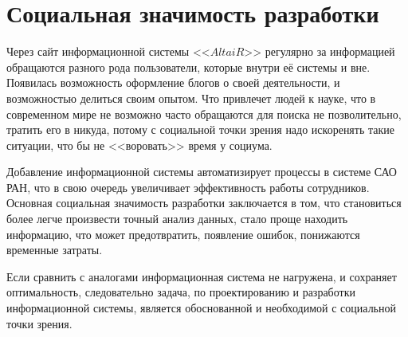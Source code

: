 \section{Социальная значимость разработки}
Через сайт информационной системы <<$AltaiR$>> регулярно за информацией обращаются разного рода пользователи, которые внутри её системы и вне. Появилась возможность оформление блогов о своей деятельности, и возможностью делиться своим опытом. Что привлечет людей к науке, что в современном мире не возможно  часто обращаются для поиска не позволительно, тратить его в никуда, потому с социальной точки зрения надо искоренять такие ситуации, что бы не <<воровать>> время у социума.   

Добавление информационной системы автоматизирует процессы в системе САО РАН, что в свою очередь увеличивает эффективность работы сотрудников. Основная социальная значимость разработки заключается в том, что становиться более легче произвести точный анализ данных, стало проще находить информацию, что может предотвратить, появление ошибок, понижаются временные затраты.

Если сравнить с аналогами информационная система не нагружена, и сохраняет оптимальность, следовательно задача, по проектированию и разработки информационной системы, является обоснованной и необходимой с социальной точки зрения.  

\pagebreak